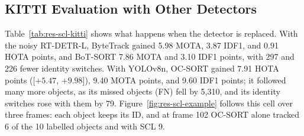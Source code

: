 \subsection{KITTI Evaluation with Other Detectors}\label{sec:res-scl-kitti}
Table~\ref{tab:res-scl-kitti} shows what happens when the detector is replaced. With the noisy RT-DETR-L, ByteTrack gained 5.98 MOTA, 3.87 IDF1, and 0.91 HOTA points, and BoT-SORT 7.86 MOTA and 3.10 IDF1 points, with 297 and 226 fewer identity switches. With YOLOv8n, OC-SORT gained 7.91 HOTA points ([$+5.47$, $+9.98$]), 9.40 MOTA points, and 9.60 IDF1 points; it followed many more objects, as its missed objects (FN) fell by 5,310, and its identity switches rose with them by 79. Figure~\ref{fig:res-scl-example} follows this cell over three frames: each object keeps its ID, and at frame 102 OC-SORT alone tracked 6 of the 10 labelled objects and with SCL 9.

